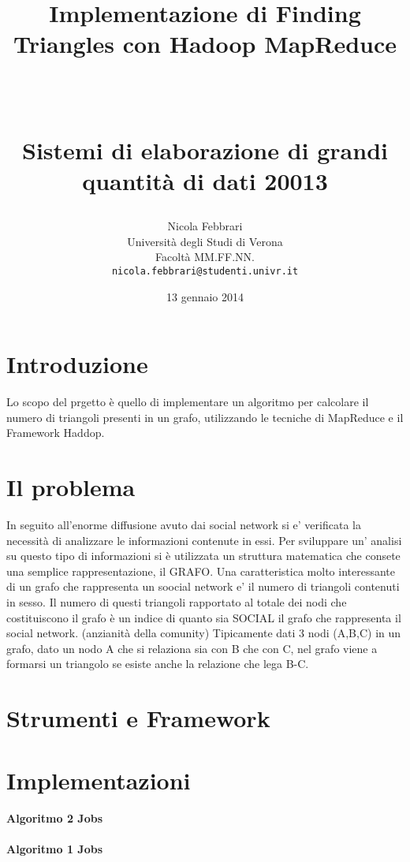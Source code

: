 \documentclass[paper=a4, fontsize=11pt]{scrartcl}	%
\title{ \vspace{-1in} 	\usefont{OT1}{bch}{b}{n}
		\huge \strut Implementazione di Finding Triangles con Hadoop MapReduce\strut \\
		\Large \bfseries \strut Sistemi di elaborazione di grandi quantit\`a di dati 20013 \strut
}
\author{ 									\usefont{OT1}{bch}{m}{n}
        Nicola Febbrari\\		\usefont{OT1}{bch}{m}{n}
        Universit\`a degli Studi di Verona\\	\usefont{OT1}{bch}{m}{n}
        Facolt\`a MM.FF.NN.\\
        \texttt{nicola.febbrari@studenti.univr.it}
}
\date{13 gennaio 2014}
\numberwithin{equation}{section}															%
\numberwithin{figure}{section}																%
\numberwithin{table}{section}																%
\begin{document}
\maketitle
\section{Introduzione}
Lo scopo del prgetto \`e quello di implementare un algoritmo per calcolare il numero di triangoli presenti in un grafo, utilizzando le tecniche di MapReduce e il Framework Haddop.


\section{Il problema}
In seguito all'enorme diffusione avuto dai social network si e' verificata la necessità di analizzare le informazioni contenute in essi. Per sviluppare un' analisi su questo tipo di informazioni si è utilizzata un struttura matematica che consete una semplice rappresentazione, il GRAFO.
Una caratteristica molto interessante di un grafo che rappresenta un soocial network e' il numero di triangoli contenuti in sesso. 
Il numero di questi triangoli rapportato al totale dei nodi che costituiscono il grafo è un indice di quanto sia SOCIAL il grafo che rappresenta il social network. (anzianità della comunity)
Tipicamente dati 3 nodi (A,B,C) in un grafo, dato un nodo  A che si relaziona sia con B che con C, nel grafo viene a formarsi un triangolo se esiste anche la relazione che lega B-C.

\section{Strumenti e Framework}


\section{Implementazioni}
\paragraph{Algoritmo 2 Jobs}
\paragraph{Algoritmo 1 Jobs}
\end{document}
